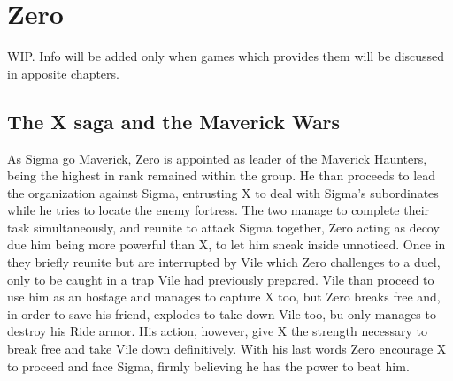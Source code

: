 \chapter{Zero}\label{char:Zero}

WIP. Info will be added only when games which provides them will be discussed in apposite chapters.

\section{The X saga and the Maverick Wars}
As Sigma go Maverick, Zero is appointed as leader of the Maverick Haunters, being the highest in rank remained within the group. He than proceeds to lead the organization against Sigma, entrusting X to deal with Sigma's subordinates while he tries to locate the enemy fortress. The two manage to complete their task simultaneously, and reunite to attack Sigma together, Zero acting as decoy due him being more powerful than X, to let him sneak inside unnoticed. Once in they briefly reunite but are interrupted by Vile which Zero  challenges to a duel, only to be caught in a trap Vile had previously prepared. Vile than proceed to use him as an hostage and manages to capture X too, but Zero breaks free and, in order to save his friend, explodes to take down Vile too, bu only manages to destroy his Ride armor. His action, however, give X the strength necessary to break free and take Vile down definitively. With his last words Zero encourage X to proceed and face Sigma, firmly believing he has the power to beat him.